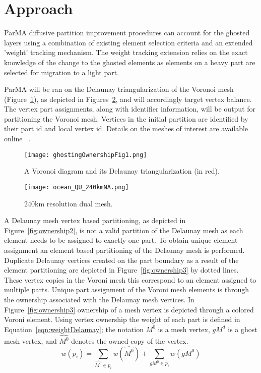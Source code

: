 \documentclass[a4paper]{article}
\begin{document}
\section{Approach}

ParMA diffusive partition improvement procedures can account for the ghosted layers using a combination of existing element selection criteria and an extended 'weight' tracking mechanism.  The weight tracking extension relies on the exact knowledge of the change to the ghosted elements as elements on a heavy part are selected for migration to a light part.

ParMA will be ran on the Delaunay triangularization of the Voronoi mesh (Figure~\ref{fig:delaunay}), as depicted in Figures~\ref{fig:NA240}, and will accordingly target vertex balance.  The vertex part assignments, along with identifier information, will be output for partitioning the Voronoi mesh. Vertices in the initial partition are identified by their part id and local vertex id.  Details on the meshes of interest are available online ~\cite{climateMesh}. 

\begin{figure} 
\centering
\texttt{[image: ghostingOwnershipFig1.png]}
\caption{\label{fig:delaunay} A Voronoi diagram and its Delaunay triangularization (in red).}
\end{figure}

\begin{figure}
\centering
\texttt{[image: ocean\_QU\_240kmNA.png]}
\caption{\label{fig:NA240} 240km resolution dual mesh.}
\end{figure}

A Delaunay mesh vertex based partitioning, as depicted in Figure~\ref{fig:ownership2}, is not a valid partition of the Delaunay mesh as each element needs to be assigned to exactly one part.  To obtain unique element assignment an element based partitioning of the Delaunay mesh is performed.  Duplicate Delaunay vertices created on the part boundary as a result of the element partitioning are depicted in Figure~\ref{fig:ownership3} by dotted lines.  These vertex copies in the Voroni mesh this correspond to an element assigned to multiple parts.  Unique part assignment of the Voroni mesh elements is through the ownership associated with the Delaunay mesh vertices.  In Figure~\ref{fig:ownership3} ownership of a mesh vertex is depicted through a colored Voroni element.  Using vertex ownership the weight of each part is defined in Equation~\ref{eqn:weightDelaunay}; the notation $M^0$ is a mesh vertex, $gM^d$ is a ghost mesh vertex, and $\hat{M^0}$ denotes the owned copy of the vertex.
\begin{equation}
\label{eqn:weightDelaunay}
w(p_i) = \sum_{\hat{M^0} \in p_i}w(\hat{M^0}) + \sum_{gM^0 \in p_i}w(gM^0)
\end{equation}
\end{document}
